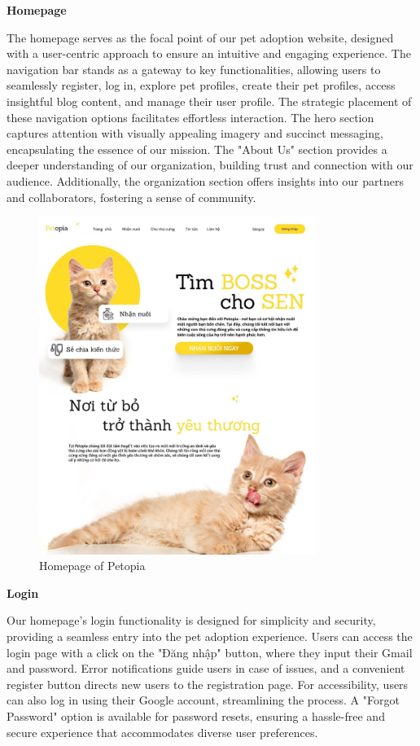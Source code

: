 \textbf{Homepage}

The homepage serves as the focal point of our pet adoption website, designed with a user-centric approach to ensure an intuitive and engaging experience. The navigation bar stands as a gateway to key functionalities, allowing users to seamlessly register, log in, explore pet profiles, create their pet profiles, access insightful blog content, and manage their user profile. The strategic placement of these navigation options facilitates effortless interaction. The hero section captures attention with visually appealing imagery and succinct messaging, encapsulating the essence of our mission. The "About Us" section provides a deeper understanding of our organization, building trust and connection with our audience. Additionally, the organization section offers insights into our partners and collaborators, fostering a sense of community.

\begin {figure}[H]
\centering
\includegraphics[width=0.8\textwidth]{Figures/home_ui.jpg}
\caption{Homepage of Petopia}
\end{figure}

\textbf{Login}

Our homepage's login functionality is designed for simplicity and security, providing a seamless entry into the pet adoption experience. Users can access the login page with a click on the "Đăng nhập" button, where they input their Gmail and password. Error notifications guide users in case of issues, and a convenient register button directs new users to the registration page. For accessibility, users can also log in using their Google account, streamlining the process. A "Forgot Password" option is available for password resets, ensuring a hassle-free and secure experience that accommodates diverse user preferences.

